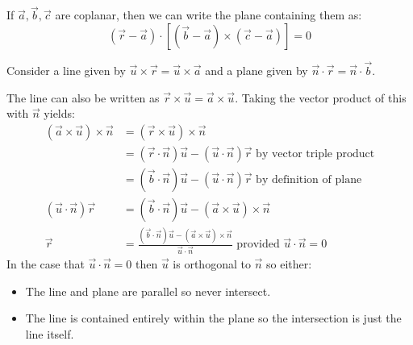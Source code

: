 \documentclass[../main.tex]{subfiles}
\begin{document}
If $\vec{a}, \vec{b}, \vec{c}$ are coplanar, then we can write the plane containing them as:
\[
  (\vec{r} - \vec{a}) \cdot [(\vec{b} - \vec{a}) \times (\vec{c} - \vec{a})] = 0
\]
\begin{example}
  Consider a line given by $\vec{u} \times \vec{r} = \vec{u} \times \vec{a}$ and a plane given by $\vec{n} \cdot \vec{r} = \vec{n} \cdot \vec{b}$.

  The line can also be written as $\vec{r} \times \vec{u} = \vec{a} \times \vec{u}$.
  Taking the vector product of this with $\vec{n}$ yields:
  \begin{align*}
    (\vec{a} \times \vec{u}) \times \vec{n} &= (\vec{r} \times \vec{u}) \times \vec{n}\\
                                            &= (\vec{r} \cdot \vec{n}) \vec{u} - (\vec{u} \cdot \vec{n}) \vec{r} \text{ by vector triple product}\\
                                            &= (\vec{b} \cdot \vec{n}) \vec{u} - (\vec{u} \cdot \vec{n}) \vec{r} \text{ by definition of plane}\\
    (\vec{u} \cdot \vec{n})\vec{r} &= (\vec{b} \cdot \vec{n}) \vec{u} - (\vec{a} \times \vec{u}) \times \vec{n}\\
    \vec{r} &= \frac{(\vec{b} \cdot\vec{n})\vec{u} - (\vec{a} \times \vec{u})\times\vec{n}}{\vec{u} \cdot\vec{n}} \text{ provided $\vec{u} \cdot \vec{n} = 0$}
  \end{align*}
  In the case that $\vec{u} \cdot \vec{n} = 0$ then $\vec{u}$ is orthogonal to $\vec{n}$ so either:
  \begin{itemize}
    \item The line and plane are parallel so never intersect.
    \item The line is contained entirely within the plane so the intersection is just the line itself.
  \end{itemize}
\end{example}
\end{document}
